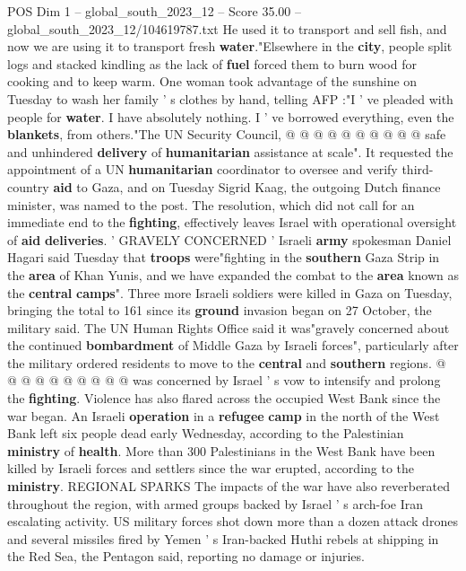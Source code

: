 \begin{textsample}{POS Dim 1 – global\_south\_2023\_12 – Score 35.00 – global\_south\_2023\_12/104619787.txt}
He used it to transport and sell fish, and now we are using it to transport fresh \textbf{water}."Elsewhere in the \textbf{city}, people split logs and stacked kindling as the lack of \textbf{fuel} forced them to burn wood for cooking and to keep warm.
One woman took advantage of the sunshine on Tuesday to wash her family ' s clothes by hand, telling AFP :"I ' ve pleaded with people for \textbf{water}.
I have absolutely nothing.
I ' ve borrowed everything, even the \textbf{blankets}, from others."The UN Security Council, @ @ @ @ @ @ @ @ @ @ safe and unhindered \textbf{delivery} of \textbf{humanitarian} assistance at scale".
It requested the appointment of a UN \textbf{humanitarian} coordinator to oversee and verify third-country \textbf{aid} to Gaza, and on Tuesday Sigrid Kaag, the outgoing Dutch finance minister, was named to the post.
The resolution, which did not call for an immediate end to the \textbf{fighting}, effectively leaves Israel with operational oversight of \textbf{aid} \textbf{deliveries}. ' GRAVELY CONCERNED ' Israeli \textbf{army} spokesman Daniel Hagari said Tuesday that \textbf{troops} were"fighting in the \textbf{southern} Gaza Strip in the \textbf{area} of Khan Yunis, and we have expanded the combat to the \textbf{area} known as the \textbf{central} \textbf{camps}".
Three more Israeli soldiers were killed in Gaza on Tuesday, bringing the total to 161 since its \textbf{ground} invasion began on 27 October, the military said.
The UN Human Rights Office said it was"gravely concerned about the continued \textbf{bombardment} of Middle Gaza by Israeli forces", particularly after the military ordered residents to move to the \textbf{central} and \textbf{southern} regions. @ @ @ @ @ @ @ @ @ @ was concerned by Israel ' s vow to intensify and prolong the \textbf{fighting}.
Violence has also flared across the occupied West Bank since the war began.
An Israeli \textbf{operation} in a \textbf{refugee} \textbf{camp} in the north of the West Bank left six people dead early Wednesday, according to the Palestinian \textbf{ministry} of \textbf{health}.
More than 300 Palestinians in the West Bank have been killed by Israeli forces and settlers since the war erupted, according to the \textbf{ministry}.
REGIONAL SPARKS The impacts of the war have also reverberated throughout the region, with armed groups backed by Israel ' s arch-foe Iran escalating activity.
US military forces shot down more than a dozen attack drones and several missiles fired by Yemen ' s Iran-backed Huthi rebels at shipping in the Red Sea, the Pentagon said, reporting no damage or injuries.

\end{textsample}
